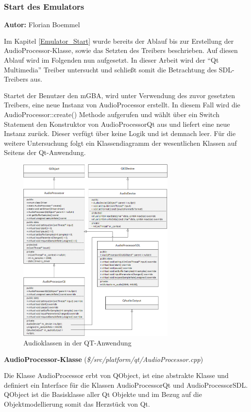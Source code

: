 \documentclass[11pt,a4paper]{scrartcl}
\newcommand{\AutorFlorian} {
    \vspace{-4mm}
    \large \textbf{Autor:} Florian Boemmel \normalsize
    \vspace{2mm}
}
\newcommand{\paratitlecode}[2] {
    \vspace{5mm}
    \large \textbf{#1} \normalsize(\textit{\${#2}})
    \vspace{2mm}\newline
}
\begin{document}
\subsubsection{Start des Emulators}
\AutorFlorian

Im Kapitel \ref{Emulator_Start} wurde bereits der Ablauf bis zur Erstellung der AudioProcessor-Klasse, sowie das Setzten des Treibers beschrieben. Auf diesen Ablauf wird im Folgenden nun aufgesetzt. In dieser Arbeit
wird der \enquote{Qt Multimedia} Treiber untersucht und schlie{\ss}t somit die Betrachtung des SDL-Treibers aus.

Startet der Benutzer den mGBA, wird unter Verwendung des zuvor gesetzten Treibers, eine neue Instanz von AudioProcessor erstellt. In diesem Fall wird die AudioProcessor::create() Methode aufgerufen und w\"ahlt \"uber ein Switch Statement den Konstruktor von AudioProcessorQt aus und liefert eine neue Instanz zur\"uck. Dieser verf\"ugt \"uber keine Logik und ist demnach leer. F\"ur die weitere Untersuchung folgt ein Klassendiagramm der wesentlichen Klassen auf Seitens der Qt-Anwendung.

\begin{figure}[h!]
    \centering
    \includegraphics[width=0.7\textwidth]{QT_Klassendiagramm}
    \caption{Audioklassen in der QT-Anwendung}
    \label{fig:qtclassdiagramm}
\end{figure}

\newpage

\paratitlecode{AudioProcessor-Klasse}{/src/platform/qt/AudioProcessor.cpp}
Die Klasse AudioProcessor erbt von QObject, ist eine abstrakte Klasse und definiert ein Interface f\"ur die Klassen AudioProcessorQt und AudioProcessorSDL. QObject ist die Basisklasse aller Qt Objekte und im Bezug auf
die Objektmodellierung somit das Herzst\"uck von Qt. 
\end{document}

